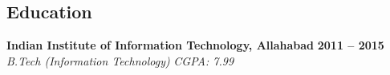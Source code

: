\documentclass[margin,line]{resume}
\newcounter{dateone}
\newcounter{datetwo}
\newcommand{\difftoday}[3]{%
      \setmydatenumber{dateone}{\the\year}{\the\month}{\the\day}%
      \setmydatenumber{datetwo}{#1}{#2}{#3}%
      \addtocounter{datetwo}{-\thedateone}%
      \the\numexpr-\thedatetwo/365\relax\space year(s),
      \the\numexpr(-\thedatetwo - (-\thedatetwo/365)*365)/30\relax\space month(s)
}
\begin{document}
  \address{mobile: +91-8826567807 \\ email: hp.iiita@gmail.com}
\begin{resume}



    \section{\mysidestyle Education}

    \textbf{Indian Institute of Information Technology, Allahabad} \hfill \textbf{2011 -- 2015}\vspace{0mm}\\\vspace{0mm}%
    \textsl{B.Tech (Information Technology)} \hfill \textsl{CGPA: 7.99}


\end{resume}
\end{document}
